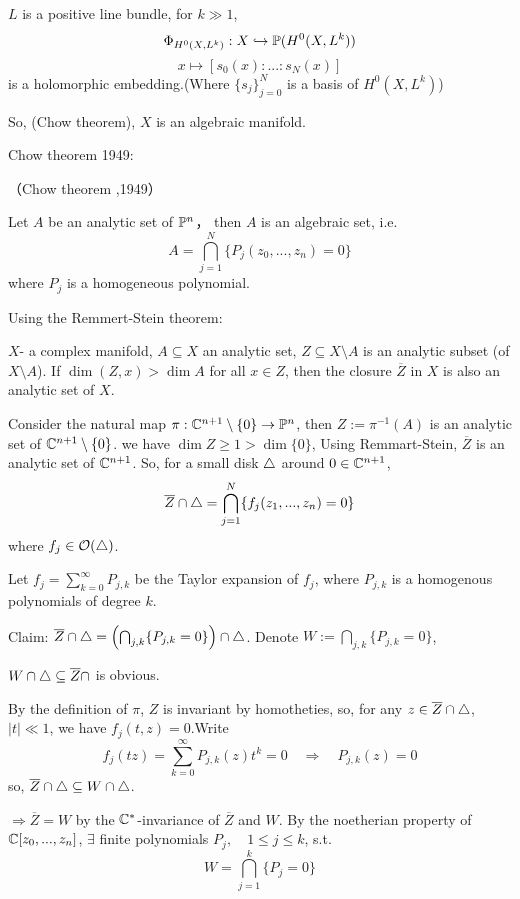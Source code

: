 \begin{thm} $L$ is a positive line bundle, for $k\gg 1$,
$$
  \Phi_{H^0(X,L^k)}:
  X\hookrightarrow\mathbb{P}(H^0(X,L^k))
$$
$$
  x\mapsto[s_0(x):...:s_N(x)]
$$
is a holomorphic embedding.(Where $\{s_j\}_{j=0}^N$
is a basis of $H^0(X,L^k)$)

So, (Chow theorem), $X$ is an algebraic manifold.
\end{thm}

Chow theorem 1949:

\begin{thm}（Chow theorem ,1949）

Let $A$ be an analytic set of $\mathbb{P}^n$，
then $A$ is an algebraic set, i.e. 
$$
  A=\bigcap_{j=1}^N
  \{P_j(z_0,...,z_n)=0\}
$$
where $P_j$ is a homogeneous polynomial.
\end{thm}

Using the Remmert-Stein theorem:

$X$- a complex manifold, $A\subseteq X$ an analytic set,
$Z\subseteq X\setminus A$ is an analytic subset (of $X\setminus A$).
If $\dim(Z,x)>\dim A$ for all $x\in Z$,
then the closure $\overline{Z}$ in $X$ is also an analytic set of $X$.

Consider the natural map $\pi:\mathbb{C}^{n+1}\setminus\{0\}\to\mathbb{P}^n$,
then $Z:=\pi^{-1}(A)$ is an analytic set of $\mathbb{C}^{n+1}\setminus\{0\}$.
we have $\dim Z\geq 1>\dim\{0\}$,
Using Remmart-Stein, $\overline{Z}$ is an analytic set of $\mathbb{C}^{n+1}$.
So, for a small disk $\triangle$ around $0\in\mathbb{C}^{n+1}$,
$$\overline{Z}\cap\triangle
=\bigcap_{j=1}^N
\{f_j(z_1,...,z_n)=0\}
$$
where $f_j\in\mathcal{O}(\triangle)$.

Let $f_j=\sum\limits_{k=0}^\infty P_{j,k}$ be the Taylor expansion
of $f_j$, where $P_{j,k}$ is a homogenous polynomials of degree $k$.

Claim: $\overline{Z}\cap\triangle=
\left(
  \bigcap_{j,k}\{P_{j,k}=0\}
\right)\cap\triangle$.
Denote $W:=\bigcap_{j,k}\{P_{j,k}=0\}$,

$W\cap\triangle\subseteq\overline{Z}\cap$ is obvious.

By the definition of $\pi$, $Z$ is invariant by homotheties,
so, for any $z\in\overline{Z}\cap\triangle$, $|t|\ll 1$,
we have $f_j(t,z)=0$.Write 
$$
  f_j(tz)
=
  \sum_{k=0}^{\infty}
    P_{j,k}(z)t^k
=0\quad
\Rightarrow
\quad
P_{j,k}(z)=0
$$
so, $\overline{Z}\cap\triangle\subseteq W\cap\triangle$.

$\Rightarrow\overline{Z}=W$ by the $\mathbb{C}^*$-invariance of $\overline{Z}$ and $W$.
By the noetherian property of $\mathbb{C}[z_0,...,z_n]$, $\exists$
finite polynomials $P_j,\quad 1\leq j\leq k$, s.t.
$$
  W=\bigcap_{j=1}^k
  \{P_j=0\}
$$

